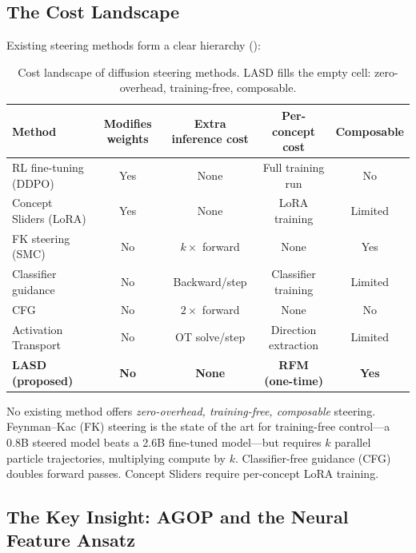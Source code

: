 \documentclass[11pt]{article}
\begin{document}
\subsection{The Cost Landscape}

Existing steering methods form a clear hierarchy ():

\begin{table}[h]
\centering
\caption{Cost landscape of diffusion steering methods. LASD fills the empty cell: zero-overhead, training-free, composable.}
\label{tab:cost}
\begin{tabular}{lcccc}
\toprule
\textbf{Method} & \textbf{Modifies weights} & \textbf{Extra inference cost} & \textbf{Per-concept cost} & \textbf{Composable} \\
\midrule
RL fine-tuning (DDPO) & Yes & None & Full training run & No \\
Concept Sliders (LoRA) & Yes & None & LoRA training & Limited \\
FK steering (SMC) & No & $k\times$ forward & None & Yes \\
Classifier guidance & No & Backward/step & Classifier training & Limited \\
CFG & No & $2\times$ forward & None & No \\
Activation Transport & No & OT solve/step & Direction extraction & Limited \\
\midrule
\textbf{LASD (proposed)} & \textbf{No} & \textbf{None} & \textbf{RFM (one-time)} & \textbf{Yes} \\
\bottomrule
\end{tabular}
\end{table}

No existing method offers \emph{zero-overhead, training-free, composable} steering.
Feynman--Kac (FK) steering \citep{singhal2025fksteering} is the state of the art for training-free control---a 0.8B steered model beats a 2.6B fine-tuned model---but requires $k$ parallel particle trajectories, multiplying compute by $k$.
Classifier-free guidance (CFG) doubles forward passes.
Concept Sliders \citep{gandikota2023concept} require per-concept LoRA training.

\subsection{The Key Insight: AGOP and the Neural Feature Ansatz}
\end{document}
